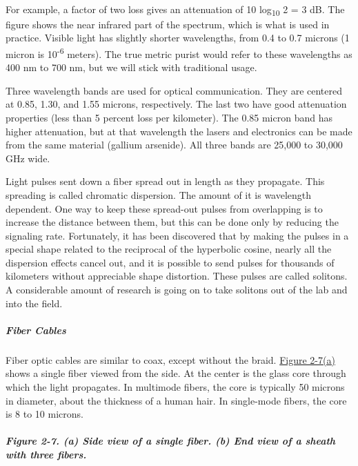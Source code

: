 

~

For example, a factor of two loss gives an attenuation of 10
log\textsubscript{10} 2 = 3 dB. The figure shows the near infrared part
of the spectrum, which is what is used in practice. Visible light has
slightly shorter wavelengths, from 0.4 to 0.7 microns (1 micron is
10\textsuperscript{-6} meters). The true metric purist would refer to
these wavelengths as 400 nm to 700 nm, but we will stick with
traditional usage.

Three wavelength bands are used for optical communication. They are
centered at 0.85, 1.30, and 1.55 microns, respectively. The last two
have good attenuation properties (less than 5 percent loss per
kilometer). The 0.85 micron band has higher attenuation, but at that
wavelength the lasers and electronics can be made from the same material
(gallium arsenide). All three bands are 25,000 to 30,000 GHz wide.

Light pulses sent down a fiber spread out in length as they propagate.
This spreading is called {chromatic dispersion}. The amount of it is
wavelength dependent. One way to keep these spread-out pulses from
overlapping is to increase the distance between them, but this can be
done only by reducing the signaling rate. Fortunately, it has been
discovered that by making the pulses in a special shape related to the
reciprocal of the hyperbolic cosine, nearly all the dispersion effects
cancel out, and it is possible to send pulses for thousands of
kilometers without appreciable shape distortion. These pulses are called
{solitons}. A considerable amount of research is going on to take
solitons out of the lab and into the field.

\protect\hypertarget{0130661023_ch02lev1sec2.htmlux5cux23ch02lev3sec2}{}{}

\subparagraph{Fiber Cables}

Fiber optic cables are similar to coax, except without the braid.
\protect\hyperlink{0130661023_ch02lev1sec2.htmlux5cux23ch02fig07}{Figure
2-7(a)} shows a single fiber viewed from the side. At the center is the
glass core through which the light propagates. In multimode fibers, the
core is typically 50 microns in diameter, about the thickness of a human
hair. In single-mode fibers, the core is 8 to 10 microns.

\subparagraph[Figure 2-7. (a) Side view of a single fiber. (b) End view
of a sheath with three
fibers.]{\texorpdfstring{\protect\hypertarget{0130661023_ch02lev1sec2.htmlux5cux23ch02fig07}{}{}Figure
2-7. (a) Side view of a single fiber. (b) End view of a sheath with
three
fibers.}{Figure 2-7. (a) Side view of a single fiber. (b) End view of a sheath with three fibers.}}

